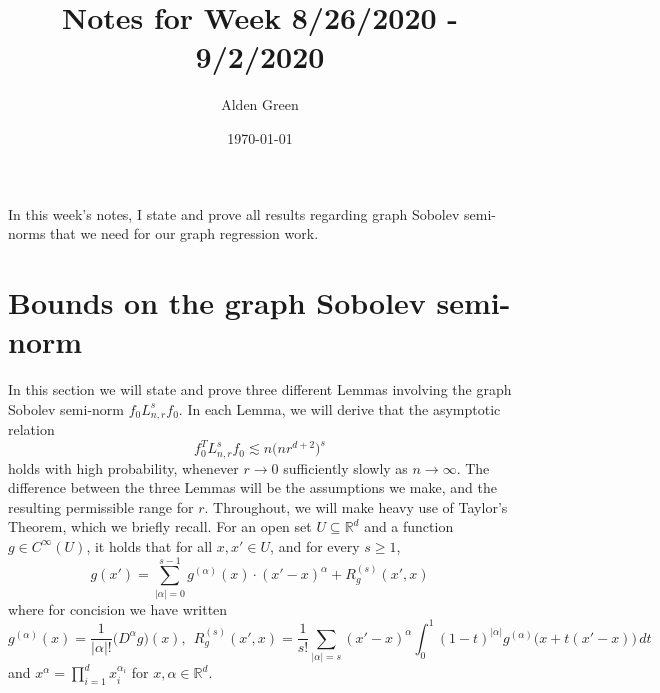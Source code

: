 \documentclass{article}
\newcommand{\Reals}{\mathbb{R}}
\newcommand{\abs}[1]{\left \lvert #1 \right \rvert}
\newcommand{\1}{\mathbf{1}}
\newcommand{\Lap}{L}
\theoremstyle{alden}
\theoremstyle{aldenthm}
\theoremstyle{definition}
\theoremstyle{remark}
\begin{document}
\title{Notes for Week 8/26/2020 - 9/2/2020}
\author{Alden Green}
\date{\today}
\maketitle

In this week's notes, I state and prove all results regarding graph Sobolev semi-norms that we need for our graph regression work. 

\section{Bounds on the graph Sobolev semi-norm}
In this section we will state and prove three different Lemmas involving the graph Sobolev semi-norm $f_0 \Lap_{n,r}^s f_0$. In each Lemma, we will derive that the asymptotic relation
\begin{equation*}
f_0^T \Lap_{n,r}^s f_0 \lesssim n \bigl(nr^{d + 2}\bigr)^s
\end{equation*}
holds with high probability, whenever $r \to 0$ sufficiently slowly as $n \to \infty$. The difference between the three Lemmas will be the assumptions we make, and the resulting permissible range for $r$. Throughout, we will make heavy use of Taylor's Theorem, which we briefly recall. For an open set $U \subseteq \Reals^d$ and a function $g \in C^{\infty}(U)$, it holds that for all $x,x' \in U$, and for every $s \geq 1$,
\begin{equation*}
g(x') = \sum_{\abs{\alpha} = 0}^{s - 1} g^{(\alpha)}(x) \cdot (x' - x)^{\alpha}  + R_g^{(s)}(x',x)
\end{equation*}
where for concision we have written 
\begin{equation*}
g^{(\alpha)}(x) = \frac{1}{\abs{\alpha}!} \bigl(D^{\alpha}g\bigr)(x),~~ R_g^{(s)}(x',x) = \frac{1}{s!} \sum_{\abs{\alpha} = s} (x' - x)^{\alpha} \int_{0}^{1} (1 - t)^{\abs{\alpha}}  g^{(\alpha)}\bigl(x + t(x' - x)\bigr) \,dt
\end{equation*}
and $x^{\alpha} = \prod_{i = 1}^{d} x_i^{\alpha_i}$ for $x,\alpha \in \Reals^d$. 
\end{document}
